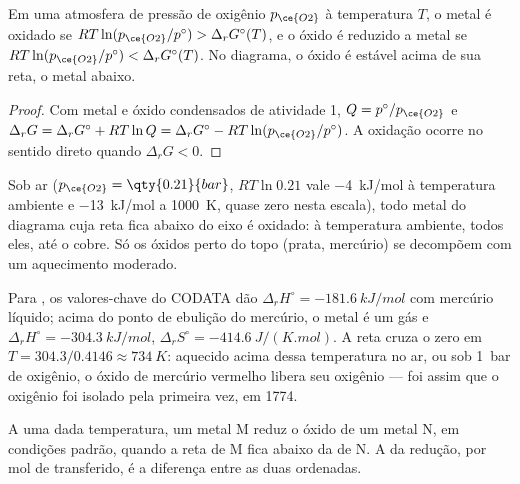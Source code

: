 \begin{theorem}\label{thm:b2:ellingham:domains}
Em uma atmosfera de pressão de oxigênio $p_{\ce{O2}}$ à temperatura $T$, o
metal é oxidado se $RT\ln(p_{\ce{O2}}/p^\circ) > \Delta_r G^\circ(T)$, e o
óxido é reduzido a metal se $RT\ln(p_{\ce{O2}}/p^\circ) < \Delta_r
G^\circ(T)$. No diagrama, o óxido é estável acima de sua reta, o metal
abaixo.
\end{theorem}

\begin{proof}
Com metal e óxido condensados de atividade 1, $Q = p^\circ/p_{\ce{O2}}$ e
$\Delta_r G = \Delta_r G^\circ + RT\ln Q = \Delta_r G^\circ - RT\ln(p_{\ce{O2}}/
p^\circ)$. A oxidação ocorre no sentido direto quando $\Delta_r G < 0$.
\end{proof}

Sob ar ($p_{\ce{O2}} = \qty{0.21}{bar}$, $RT\ln 0.21$ vale \qty{-4}{kJ/mol}
à temperatura ambiente e \qty{-13}{kJ/mol} a \qty{1000}{K}, quase zero nesta
escala), todo metal do diagrama cuja reta
fica abaixo do eixo é oxidado: à temperatura ambiente, todos eles, até o
cobre. Só os óxidos perto do topo (prata, mercúrio) se decompõem com um
aquecimento moderado.

\begin{example}\label{ex:b2:ellingham:hgo}
Para , os valores-chave do CODATA dão $\Delta_r H^\circ =
\qty{-181.6}{kJ/mol}$ com mercúrio líquido; acima do ponto de ebulição do
mercúrio, o metal é um gás e $\Delta_r H^\circ = \qty{-304.3}{kJ/mol}$, $\Delta_r
S^\circ = \qty{-414.6}{J/(K.mol)}$. A reta cruza o zero em
$T = 304.3/0.4146 \approx \qty{734}{K}$: aquecido acima dessa temperatura no
ar, ou sob \qty{1}{bar} de oxigênio, o óxido de mercúrio vermelho libera seu
oxigênio --- foi assim que o oxigênio foi isolado pela primeira vez, em 1774.
\end{example}

\begin{proposition}\label{prop:b2:ellingham:reduction}
A uma dada temperatura, um metal M reduz o óxido de um metal N, em
condições padrão, quando a reta de M fica abaixo da de N. A  da redução, por mol de  transferido, é a
diferença entre as duas ordenadas.
\end{proposition}

